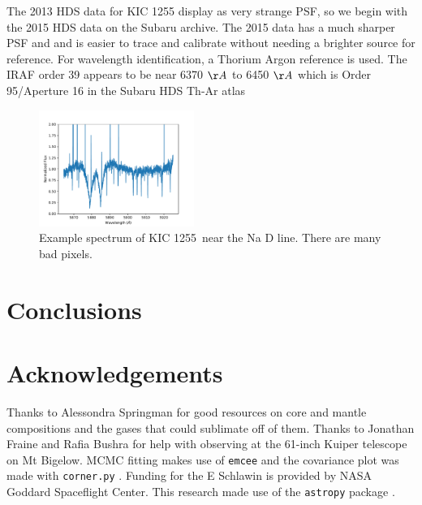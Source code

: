 \documentclass[twocolumn]{aastex61}
\newcommand{\shStar}{KIC 1255}
\begin{document}
The 2013 HDS data for KIC 1255 display as very strange PSF, so we begin with the 2015 HDS data on the Subaru archive.
The 2015 data has a much sharper PSF and and is easier to trace and calibrate without needing a brighter source for reference.
For wavelength identification, a Thorium Argon reference is used.
The IRAF order 39 appears to be near 6370 $\AA$ to 6450 $\AA$ which is Order 95/Aperture 16 in the Subaru HDS Th-Ar atlas

\begin{figure}
\begin{centering}
\includegraphics[width=0.45\textwidth]{images/subaru/nad_spec.pdf}
\caption{Example spectrum of \shStar\ near the Na D line.
There are many bad pixels.}\label{fig:naDline}
\end{centering}
\end{figure}


\section{Conclusions}\label{sec:conclusions}

\section{Acknowledgements}
Thanks to Alessondra Springman for good resources on core and mantle compositions and the gases that could sublimate off of them.
Thanks to Jonathan Fraine and Rafia Bushra for help with observing at the 61-inch Kuiper telescope on Mt Bigelow.
MCMC fitting makes use of \texttt{emcee} \citep{foreman-mackey2013emcee} and the covariance plot was made with \texttt{corner.py} \citep{foremanCorner}.
Funding for the E Schlawin is provided by NASA Goddard Spaceflight Center.
This research made use of the \texttt{astropy} package \citep{astropy2013}.

\end{document}
